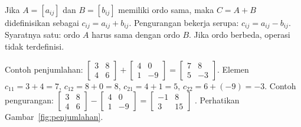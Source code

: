 \documentclass[11pt,a4paper]{article}
\begin{document}
Jika $A=[a_{ij}]$ dan $B=[b_{ij}]$ memiliki ordo sama, maka $C=A+B$ didefinisikan sebagai $c_{ij}=a_{ij}+b_{ij}$. Pengurangan bekerja serupa: $c_{ij}=a_{ij}-b_{ij}$. Syaratnya satu: ordo $A$ harus sama dengan ordo $B$. Jika ordo berbeda, operasi tidak terdefinisi.

Contoh penjumlahan: $\begin{bmatrix}3&8\\4&6\end{bmatrix}+\begin{bmatrix}4&0\\1&-9\end{bmatrix}=\begin{bmatrix}7&8\\5&-3\end{bmatrix}$. Elemen $c_{11}=3+4=7$, $c_{12}=8+0=8$, $c_{21}=4+1=5$, $c_{22}=6+(-9)=-3$. Contoh pengurangan: $\begin{bmatrix}3&8\\4&6\end{bmatrix}-\begin{bmatrix}4&0\\1&-9\end{bmatrix}=\begin{bmatrix}-1&8\\3&15\end{bmatrix}$ \cite{lipschutz}. Perhatikan Gambar~\ref{fig:penjumlahan}.
\end{document}
